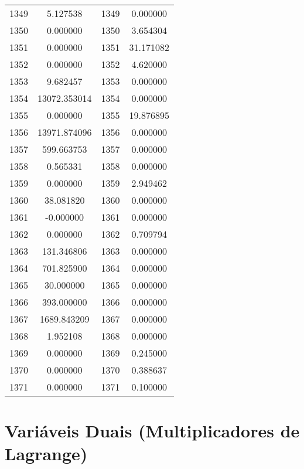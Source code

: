 \documentclass[12pt]{article}
\begin{document}
\begin{longtable}{@{}cccc@{}}
1349 & 5.127538 & 1349 & 0.000000 \\
1350 & 0.000000 & 1350 & 3.654304 \\
1351 & 0.000000 & 1351 & 31.171082 \\
1352 & 0.000000 & 1352 & 4.620000 \\
1353 & 9.682457 & 1353 & 0.000000 \\
1354 & 13072.353014 & 1354 & 0.000000 \\
1355 & 0.000000 & 1355 & 19.876895 \\
1356 & 13971.874096 & 1356 & 0.000000 \\
1357 & 599.663753 & 1357 & 0.000000 \\
1358 & 0.565331 & 1358 & 0.000000 \\
1359 & 0.000000 & 1359 & 2.949462 \\
1360 & 38.081820 & 1360 & 0.000000 \\
1361 & -0.000000 & 1361 & 0.000000 \\
1362 & 0.000000 & 1362 & 0.709794 \\
1363 & 131.346806 & 1363 & 0.000000 \\
1364 & 701.825900 & 1364 & 0.000000 \\
1365 & 30.000000 & 1365 & 0.000000 \\
1366 & 393.000000 & 1366 & 0.000000 \\
1367 & 1689.843209 & 1367 & 0.000000 \\
1368 & 1.952108 & 1368 & 0.000000 \\
1369 & 0.000000 & 1369 & 0.245000 \\
1370 & 0.000000 & 1370 & 0.388637 \\
1371 & 0.000000 & 1371 & 0.100000 \\

\end{longtable}

\section{Variáveis Duais (Multiplicadores de Lagrange)}
\end{document}
